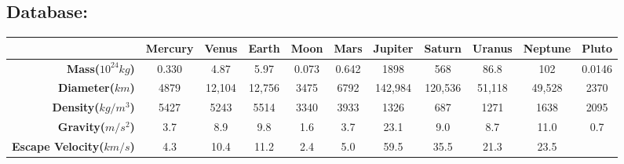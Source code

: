 \begin{landscape}
\appendix
\section{Database:}
\begin{table}[H]
\centering
\begin{tabular}{|r|c|c|c|c|c|c|c|c|c|c|}
\hline
\multicolumn{1}{|c|}{} &
  \textbf{Mercury} &
  \textbf{Venus} &
  \textbf{Earth} &
  \textbf{Moon} &
  \textbf{Mars} &
  \textbf{Jupiter} &
  \textbf{Saturn} &
  \textbf{Uranus} &
  \textbf{Neptune} &
  \textbf{Pluto} \\ \hline
\textbf{Mass($10^{24}kg$)} &
  \cellcolor[HTML]{F5F5F5}0.330 &
  \cellcolor[HTML]{FFFFFF}4.87 &
  \cellcolor[HTML]{F5F5F5}5.97 &
  \cellcolor[HTML]{FFFFFF}0.073 &
  \cellcolor[HTML]{F5F5F5}0.642 &
  \cellcolor[HTML]{FFFFFF}1898 &
  \cellcolor[HTML]{F5F5F5}568 &
  \cellcolor[HTML]{FFFFFF}86.8 &
  \cellcolor[HTML]{F5F5F5}102 &
  0.0146 \\ \hline
\textbf{Diameter($km$)} &
  \cellcolor[HTML]{F5F5F5}4879 &
  \cellcolor[HTML]{FFFFFF}12,104 &
  \cellcolor[HTML]{F5F5F5}12,756 &
  \cellcolor[HTML]{FFFFFF}3475 &
  \cellcolor[HTML]{F5F5F5}6792 &
  \cellcolor[HTML]{FFFFFF}142,984 &
  \cellcolor[HTML]{F5F5F5}120,536 &
  \cellcolor[HTML]{FFFFFF}51,118 &
  \cellcolor[HTML]{F5F5F5}49,528 &
  \cellcolor[HTML]{FFFFFF}2370 \\ \hline
\textbf{Density($kg/m^3$)} &
  \cellcolor[HTML]{F5F5F5}5427 &
  \cellcolor[HTML]{FFFFFF}5243 &
  \cellcolor[HTML]{F5F5F5}5514 &
  \cellcolor[HTML]{FFFFFF}3340 &
  \cellcolor[HTML]{F5F5F5}3933 &
  \cellcolor[HTML]{FFFFFF}1326 &
  \cellcolor[HTML]{F5F5F5}687 &
  \cellcolor[HTML]{FFFFFF}1271 &
  \cellcolor[HTML]{F5F5F5}1638 &
  \cellcolor[HTML]{FFFFFF}2095 \\ \hline
\textbf{Gravity($m/s^2$)} &
  \cellcolor[HTML]{F5F5F5}3.7 &
  \cellcolor[HTML]{FFFFFF}8.9 &
  \cellcolor[HTML]{F5F5F5}9.8 &
  \cellcolor[HTML]{FFFFFF}1.6 &
  \cellcolor[HTML]{F5F5F5}3.7 &
  \cellcolor[HTML]{FFFFFF}23.1 &
  \cellcolor[HTML]{F5F5F5}9.0 &
  \cellcolor[HTML]{FFFFFF}8.7 &
  \cellcolor[HTML]{F5F5F5}11.0 &
  \cellcolor[HTML]{FFFFFF}0.7 \\ \hline
\textbf{Escape Velocity($km/s$)} &
  \cellcolor[HTML]{F5F5F5}4.3 &
  \cellcolor[HTML]{FFFFFF}10.4 &
  \cellcolor[HTML]{F5F5F5}11.2 &
  \cellcolor[HTML]{FFFFFF}2.4 &
  \cellcolor[HTML]{F5F5F5}5.0 &
  \cellcolor[HTML]{FFFFFF}59.5 &
  \cellcolor[HTML]{F5F5F5}35.5 &
  \cellcolor[HTML]{FFFFFF}21.3 &
  \cellcolor[HTML]{F5F5F5}23.5 &

\end{tabular}
\end{table}
\end{landscape}
